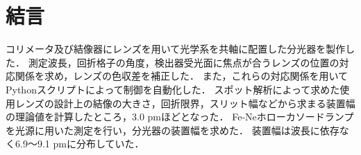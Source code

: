 \chapter{結言}
コリメータ及び結像器にレンズを用いて光学系を共軸に配置した分光器を製作した．
測定波長，回折格子の角度，検出器受光面に焦点が合うレンズの位置の対応関係を求め，レンズの色収差を補正した．
また，これらの対応関係を用いてPythonスクリプトによって制御を自動化した．
スポット解析によって求めた使用レンズの設計上の結像の大きさ，回折限界，スリット幅などから求まる装置幅の理論値を計算したところ，3.0 pmほどとなった．
Fe-Neホローカソードランプを光源に用いた測定を行い，分光器の装置幅を求めた．
装置幅は波長に依存なく6.9～9.1 pmに分布していた．

\label{chap:conclusion}